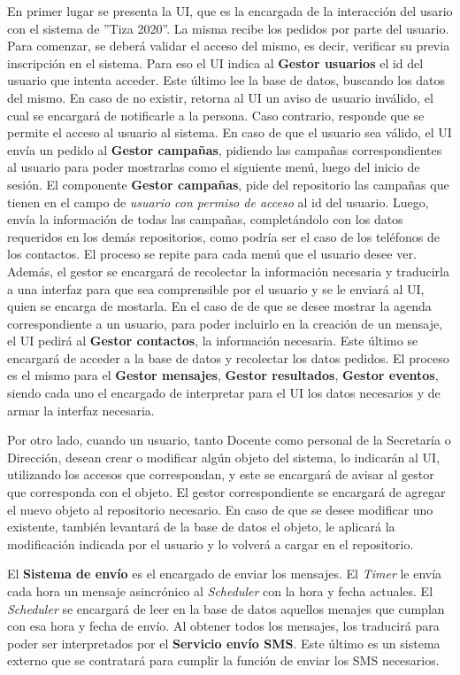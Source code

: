\documentclass[a4paper, 11pt]{article}
\begin{document}
En primer lugar se presenta la UI, que es la encargada de la interacción del usario con el sistema de ''Tiza 2020''. La misma recibe los pedidos por parte del usuario. Para comenzar, se deberá validar el acceso del mismo, es decir, verificar su previa inscripción en el sistema. Para eso el UI indica al \textbf{Gestor usuarios} el id del usuario que intenta acceder. Este último lee la base de datos, buscando los datos del mismo. En caso de no existir, retorna al UI un aviso de usuario inválido, el cual se encargará de notificarle a la persona. Caso contrario, responde que se permite el acceso al usuario al sistema. 
En caso de que el usuario sea válido, el UI envía un pedido al \textbf{Gestor campa\~nas}, pidiendo las campa\~nas correspondientes al usuario para poder mostrarlas como el siguiente menú, luego del inicio de sesión. El componente \textbf{Gestor campa\~nas}, pide del repositorio las campa\~nas que tienen en el campo de \emph{usuario con permiso de acceso} al id del usuario. Luego, envía la información de todas las campa\~nas, completándolo con los datos requeridos en los demás repositorios, como podría ser el caso de los teléfonos de los contactos. 
El proceso se repite para cada menú que el usuario desee ver. Además, el gestor se encargará de recolectar la información necesaria y traducirla a una interfaz para que sea comprensible por el usuario y se le enviará al UI, quien se encarga de mostarla. En el caso de de que se desee mostrar la agenda correspondiente a un usuario, para poder incluirlo en la creación de un mensaje, el UI pedirá al \textbf{Gestor contactos}, la información necesaria. Este último se encargará de acceder a la base de datos y recolectar los datos pedidos. El proceso es el mismo para el \textbf{Gestor mensajes}, \textbf{Gestor resultados}, \textbf{Gestor eventos}, siendo cada uno el encargado de interpretar para el UI los datos necesarios y de armar la interfaz necesaria. 

Por otro lado, cuando un usuario, tanto Docente como personal de la Secretaría o Dirección, desean crear o modificar algún objeto del sistema, lo indicarán al UI, utilizando los accesos que correspondan, y este se encargará de avisar al gestor que corresponda con el objeto. El gestor correspondiente se encargará de agregar el nuevo objeto al repositorio necesario.  En caso de que se desee modificar uno existente, también levantará de la base de datos el objeto, le aplicará la modificación indicada por el usuario y lo volverá a cargar en el repositorio. 

El \textbf{Sistema de envío} es el encargado de enviar los mensajes. El \emph{Timer} le envía cada hora un mensaje asincrónico al \emph{Scheduler} con la hora y fecha actuales. El \emph{Scheduler} se encargará de leer en la base de datos aquellos menajes que cumplan con esa hora y fecha de envío. Al obtener todos los mensajes, los traducirá para poder ser interpretados por el \textbf{Servicio envío SMS}. Este último es un sistema externo que se contratará para cumplir la función de enviar los SMS necesarios. 
\end{document}
